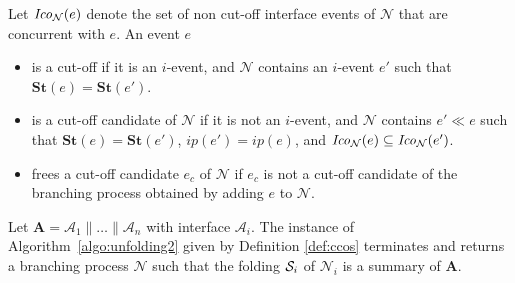 \documentclass{llncs}
\def\A{\mathcal{A}}
\def\prod{\mathbf{A}}
\def\N{\mathcal{N}}
\def\S{\mathcal{S}}
\def\scause{\ll}
\newcommand{\st}[1]{\mathbf{St}(#1)}
\newcommand{\Coni}[2]{{\it Ico}_{#1}(#2)}
\renewcommand{\S}{{\cal S}}
\begin{document}
\begin{definition} 
\label{def:ccos}
Let $\Coni{\N}{e}$ denote the set of 
non cut-off interface events of $\N$ that are concurrent with $e$. An event $e$  
\begin{itemize}
\item is a cut-off if it is an $i$-event, and $\N$ contains an $i$-event $e'$ 
such that $\st{e}=\st{e'}$.
\item is a cut-off candidate of $\N$ if it is not an $i$-event, and $\N$ contains $e' \scause  e$ such that
$\st{e}=\st{e'}$, $ip(e')=ip(e)$, and $\Coni{\N}{e} \subseteq \Coni{\N}{e'}$. 
\item frees a cut-off candidate $e_c$ of $\N$ if $e_c$ is not a cut-off candidate of the branching process
obtained by adding $e$ to $\N$. 
\end{itemize}
\end{definition}


\begin{theorem}
\label{thm:correctnessacceptable}
Let $\prod = \A_1 \parallel \ldots \parallel \A_n$ with interface $\A_i$. The instance of Algorithm~\ref{algo:unfolding2} given by Definition \ref{def:ccos} terminates and returns a branching process $\N$ such that the folding $\S_i$
of $\N_i$ is a summary of $\prod$.
\end{theorem}
\end{document}
